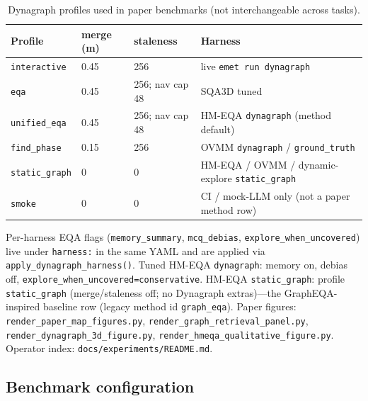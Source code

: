 \begin{table}[t]
  \centering
  \caption{Dynagraph profiles used in paper benchmarks (not interchangeable across tasks).}
  \label{tab:dynagraph_profiles}
  \small
  \begin{tabular}{@{}llll@{}}
    \toprule
    Profile & merge (m) & staleness & Harness \\
    \midrule
    \texttt{interactive} & 0.45 & 256 & live \texttt{emet run dynagraph} \\
    \texttt{eqa} & 0.45 & 256; nav cap 48 & SQA3D tuned \\
    \texttt{unified\_eqa} & 0.45 & 256; nav cap 48 & HM-EQA \texttt{dynagraph} (method default) \\
    \texttt{find\_phase} & 0.15 & 256 & OVMM \texttt{dynagraph} / \texttt{ground\_truth} \\
    \texttt{static\_graph} & 0 & 0 & HM-EQA / OVMM / dynamic-explore \texttt{static\_graph} \\
    \texttt{smoke} & 0 & 0 & CI / mock-LLM only (not a paper method row) \\
    \bottomrule
  \end{tabular}
\end{table}

Per-harness EQA flags (\texttt{memory\_summary}, \texttt{mcq\_debias}, \texttt{explore\_when\_uncovered}) live under \texttt{harness:} in the same YAML and are applied via \texttt{apply\_dynagraph\_harness()}.
Tuned HM-EQA \texttt{dynagraph}: memory on, debias off, \texttt{explore\_when\_uncovered=conservative}.
HM-EQA \texttt{static\_graph}: profile \texttt{static\_graph} (merge/staleness off; no Dynagraph extras)---the GraphEQA-inspired baseline row (legacy method id \texttt{graph\_eqa}).
Paper figures: \texttt{render\_paper\_map\_figures.py}, \texttt{render\_graph\_retrieval\_panel.py}, \texttt{render\_dynagraph\_3d\_figure.py}, \texttt{render\_hmeqa\_qualitative\_figure.py}.
Operator index: \texttt{docs/experiments/README.md}.

\subsection{Benchmark configuration}

